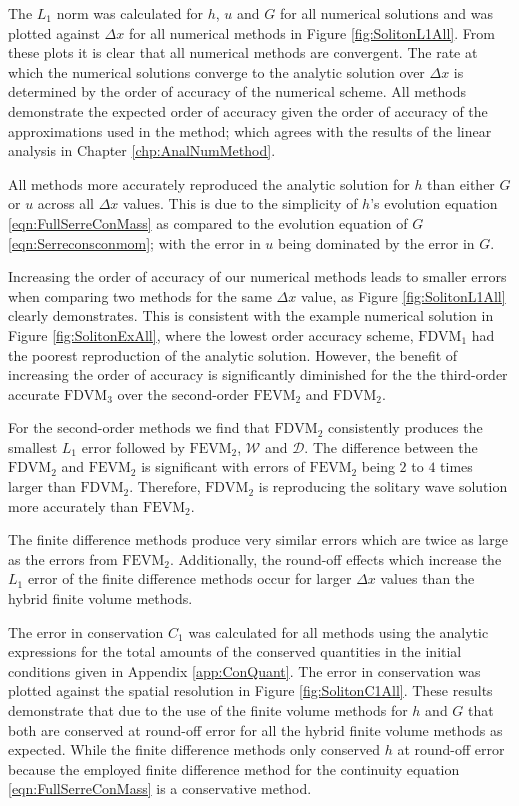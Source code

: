 The $L_1$ norm was calculated for $h$, $u$ and $G$ for all numerical solutions and was plotted against $\Delta x$ for all numerical methods in Figure \ref{fig:SolitonL1All}. From these plots it is clear that all numerical methods are convergent. The rate at which the numerical solutions converge to the analytic solution over $\Delta x$ is determined by the order of accuracy of the numerical scheme. All methods demonstrate the expected order of accuracy given the order of accuracy of the approximations used in the method; which agrees with the results of the linear analysis in Chapter \ref{chp:AnalNumMethod}.  

All methods more accurately reproduced the analytic solution for $h$ than either $G$ or $u$ across all $\Delta x$ values. This is due to the simplicity of $h$'s evolution equation \eqref{eqn:FullSerreConMass} as compared to the evolution equation of $G$ \eqref{eqn:Serreconsconmom}; with the error in $u$ being dominated by the error in $G$. 

Increasing the order of accuracy of our numerical methods leads to smaller errors when comparing two methods for the same $\Delta x$ value, as Figure \ref{fig:SolitonL1All} clearly demonstrates. This is consistent with the example numerical solution in Figure \ref{fig:SolitonExAll}, where the lowest order accuracy scheme, $\text{FDVM}_1$ had the poorest reproduction of the analytic solution. However, the benefit of increasing the order of accuracy is significantly diminished for the the third-order accurate $\text{FDVM}_3$ over the second-order $\text{FEVM}_2$ and $\text{FDVM}_2$.

For the second-order methods we find that $\text{FDVM}_2$ consistently produces the smallest $L_1$ error followed by $\text{FEVM}_2$, $\mathcal{W}$ and $\mathcal{D}$. The difference between the $\text{FDVM}_2$ and $\text{FEVM}_2$ is significant with errors of $\text{FEVM}_2$ being $2$ to $4$ times larger than $\text{FDVM}_2$. Therefore, $\text{FDVM}_2$ is reproducing the solitary wave solution more accurately than $\text{FEVM}_2$.

The finite difference methods produce very similar errors which are twice as large as the errors from $\text{FEVM}_2$. Additionally, the round-off effects which increase the $L_1$ error of the finite difference methods occur for larger $\Delta x$ values than the hybrid finite volume methods.

The error in conservation $C_1$ was calculated for all methods using the analytic expressions for the total amounts of the conserved quantities in the initial conditions given in Appendix \ref{app:ConQuant}. The error in conservation was plotted against the spatial resolution in Figure \ref{fig:SolitonC1All}. These results demonstrate that due to the use of the finite volume methods for $h$ and $G$ that both are conserved at round-off error for all the hybrid finite volume methods as expected. While the finite difference methods only conserved $h$ at round-off error because the employed finite difference method for the continuity equation \eqref{eqn:FullSerreConMass} is a conservative method. 


